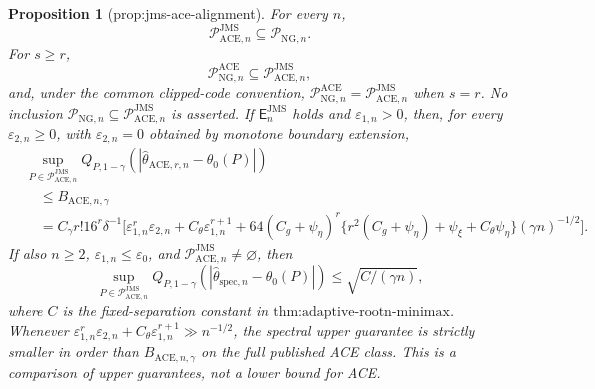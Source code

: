 \documentclass{article}
\newtheorem{proposition}{Proposition}
\begin{document}
\begin{proposition}[prop:jms-ace-alignment]\label{prop:jms-ace-alignment}
For every \(n\),
\[
 \mathcal P_{\mathrm{ACE},n}^{\mathrm{JMS}}
 \subseteq\mathcal P_{\mathrm{NG},n}.
\]
For \(s\ge r\),
\[
 \mathcal P_{\mathrm{NG},n}^{\mathrm{ACE}}
 \subseteq\mathcal P_{\mathrm{ACE},n}^{\mathrm{JMS}},
\]
and, under the common clipped-code convention, \(\mathcal P_{\mathrm{NG},n}^{\mathrm{ACE}}=\mathcal P_{\mathrm{ACE},n}^{\mathrm{JMS}}\) when \(s=r\). No inclusion \(\mathcal P_{\mathrm{NG},n}\subseteq\mathcal P_{\mathrm{ACE},n}^{\mathrm{JMS}}\) is asserted. If \(\mathsf E_n^{\mathrm{JMS}}\) holds and \(\varepsilon_{1,n}>0\), then, for every \(\varepsilon_{2,n}\ge0\), with \(\varepsilon_{2,n}=0\) obtained by monotone boundary extension,
\[
\begin{aligned}
 &\sup_{P\in\mathcal P_{\mathrm{ACE},n}^{\mathrm{JMS}}}
 Q_{P,1-\gamma}(|\widehat\theta_{\mathrm{ACE},r,n}-\theta_0(P)|)\\
 &\quad\le B_{\mathrm{ACE},n,\gamma}\\
 &\quad=C_{\gamma}r!16^r\delta^{-1}
 \Big[\varepsilon_{1,n}^r\varepsilon_{2,n}
 +C_{\theta}\varepsilon_{1,n}^{r+1}
 +64(C_g+\psi_{\eta})^r
 \{r^2(C_g+\psi_{\eta})+\psi_{\xi}+C_{\theta}\psi_{\eta}\}
 (\gamma n)^{-1/2}\Big].
\end{aligned}
\]
If also \(n\ge2\), \(\varepsilon_{1,n}\le\varepsilon_0\), and \(\mathcal P_{\mathrm{ACE},n}^{\mathrm{JMS}}\neq\varnothing\), then
\[
 \sup_{P\in\mathcal P_{\mathrm{ACE},n}^{\mathrm{JMS}}}
 Q_{P,1-\gamma}(|\widehat\theta_{\mathrm{spec},n}-\theta_0(P)|)
 \le\sqrt{C/(\gamma n)},
\]
where \(C\) is the fixed-separation constant in \(\text{thm:adaptive-rootn-minimax}\). Whenever \(\varepsilon_{1,n}^r\varepsilon_{2,n}+C_{\theta}\varepsilon_{1,n}^{r+1}\gg n^{-1/2}\), the spectral upper guarantee is strictly smaller in order than \(B_{\mathrm{ACE},n,\gamma}\) on the full published ACE class. This is a comparison of upper guarantees, not a lower bound for ACE.
\end{proposition}
\end{document}

